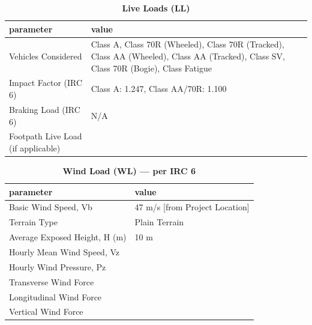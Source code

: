 \documentclass[12pt,a4paper]{report}
\numberwithin{table}{chapter}
\numberwithin{figure}{chapter}
\begin{document}
\vspace{1em}
\begin{longtable}{|L{5.5cm}|p{10.0cm}|}
\caption{\textbf{Live Loads (LL)}}
\hline
\textbf{parameter} & \textbf{value} \\
\hline
\textnormal{Vehicles Considered} & Class A, Class 70R (Wheeled), Class 70R (Tracked), Class AA (Wheeled), Class AA (Tracked), Class SV, Class 70R (Bogie), Class Fatigue \\[6pt]
\hline
\textnormal{Impact Factor (IRC 6)} & Class A:\allowbreak{} 1.247, Class AA/70R:\allowbreak{} 1.100 \\[6pt]
\hline
\textnormal{Braking Load (IRC 6)} & N/A \\[6pt]
\hline
\textnormal{Footpath Live Load (if applicable)} &  \\[6pt]
\hline
\end{longtable}

\vspace{1em}
\begin{longtable}{|L{5.5cm}|p{10.0cm}|}
\caption{\textbf{Wind Load (WL) --- per IRC 6}}
\hline
\textbf{parameter} & \textbf{value} \\
\hline
\textnormal{Basic Wind Speed, Vb} & 47 m/s [from Project Location] \\[6pt]
\hline
\textnormal{Terrain Type} & Plain Terrain \\[6pt]
\hline
\textnormal{Average Exposed Height, H (m)} & 10 m \\[6pt]
\hline
\textnormal{Hourly Mean Wind Speed, Vz} &  \\[6pt]
\hline
\textnormal{Hourly Wind Pressure, Pz} &  \\[6pt]
\hline
\textnormal{Transverse Wind Force} &  \\[6pt]
\hline
\textnormal{Longitudinal Wind Force} &  \\[6pt]
\hline
\textnormal{Vertical Wind Force} &  \\[6pt]
\hline
\end{longtable}
\end{document}

